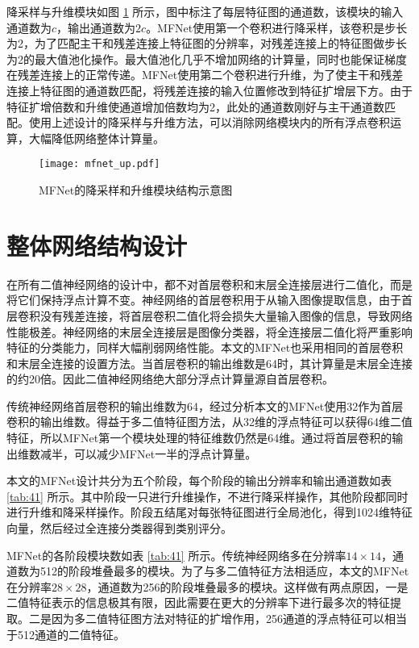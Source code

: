 降采样与升维模块如图 \ref{fig:mfnet_up} 所示，图中标注了每层特征图的通道数，该模块的输入通道数为$c$，输出通道数为$2c$。MFNet使用第一个卷积进行降采样，该卷积是步长为2，为了匹配主干和残差连接上特征图的分辨率，对残差连接上的特征图做步长为2的最大值池化操作。最大值池化几乎不增加网络的计算量，同时也能保证梯度在残差连接上的正常传递。MFNet使用第二个卷积进行升维，为了使主干和残差连接上特征图的通道数匹配，将残差连接的输入位置修改到特征扩增层下方。由于特征扩增倍数和升维使通道增加倍数均为2，此处的通道数刚好与主干通道数匹配。使用上述设计的降采样与升维方法，可以消除网络模块内的所有浮点卷积运算，大幅降低网络整体计算量。

\begin{figure}[htb]
  \centering
  \texttt{[image: mfnet\_up.pdf]}
  \caption{MFNet的降采样和升维模块结构示意图}
  \label{fig:mfnet_up}
\end{figure}

\section{整体网络结构设计}

在所有二值神经网络的设计中，都不对首层卷积和末层全连接层进行二值化，而是将它们保持浮点计算不变。神经网络的首层卷积用于从输入图像提取信息，由于首层卷积没有残差连接，将首层卷积二值化将会损失大量输入图像的信息，导致网络性能极差。神经网络的末层全连接层是图像分类器，将全连接层二值化将严重影响特征的分类能力，同样大幅削弱网络性能。本文的MFNet也采用相同的首层卷积和末层全连接的设置方法。当首层卷积的输出维数是64时，其计算量是末层全连接的约20倍。因此二值神经网络绝大部分浮点计算量源自首层卷积。

传统神经网络首层卷积的输出维数为64\cite{resnet}，经过分析本文的MFNet使用32作为首层卷积的输出维数。得益于多二值特征图方法，从32维的浮点特征可以获得64维二值特征，所以MFNet第一个模块处理的特征维数仍然是64维。通过将首层卷积的输出维数减半，可以减少MFNet一半的浮点计算量。

本文的MFNet设计共分为五个阶段，每个阶段的输出分辨率和输出通道数如表 \ref{tab:41} 所示。其中阶段一只进行升维操作，不进行降采样操作，其他阶段都同时进行升维和降采样操作。阶段五结尾对每张特征图进行全局池化，得到1024维特征向量，然后经过全连接分类器得到类别评分。

MFNet的各阶段模块数如表 \ref{tab:41} 所示。传统神经网络多在分辨率$14 \times 14$，通道数为512的阶段堆叠最多的模块。为了与多二值特征方法相适应，本文的MFNet在分辨率$28 \times 28$，通道数为256的阶段堆叠最多的模块。这样做有两点原因，一是二值特征表示的信息极其有限，因此需要在更大的分辨率下进行最多次的特征提取。二是因为多二值特征图方法对特征的扩增作用，256通道的浮点特征可以相当于512通道的二值特征。

